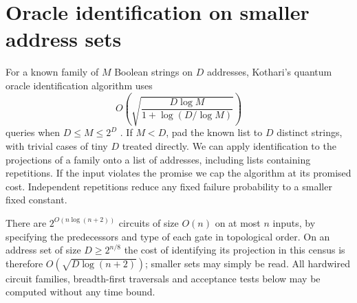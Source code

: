 \documentclass[11pt]{article}
\begin{document}
\section{Oracle identification on smaller address sets}
For a known family of $M$ Boolean strings on $D$ addresses, Kothari's quantum oracle identification algorithm uses
\[
 O\!\left(\sqrt{\frac{D\log M}{1+\log(D/\log M)}}\right)
\]
queries when $D\le M\le 2^D$ \cite{kothari}. If $M<D$, pad the known list to $D$ distinct strings, with trivial cases of tiny $D$ treated directly. We can apply identification to the projections of a family onto a list of addresses, including lists containing repetitions. If the input violates the promise we cap the algorithm at its promised cost. Independent repetitions reduce any fixed failure probability to a smaller fixed constant.

There are $2^{O(n\log(n+2))}$ circuits of size $O(n)$ on at most $n$ inputs, by specifying the predecessors and type of each gate in topological order. On an address set of size $D\ge 2^{n/8}$ the cost of identifying its projection in this census is therefore $O(\sqrt{D\log(n+2)})$; smaller sets may simply be read. All hardwired circuit families, breadth-first traversals and acceptance tests below may be computed without any time bound.
\end{document}
